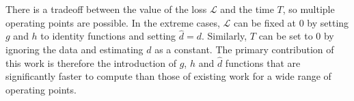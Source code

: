 

There is a tradeoff between the value of the loss $\mathcal{L}$ and the time $T$, so multiple operating points are possible. In the extreme cases, $\mathcal{L}$ can be fixed at 0 by setting $g$ and $h$ to identity functions and setting $\hat{d} = d$. Similarly, $T$ can be set to $0$ by ignoring the data and estimating $d$ as a constant. The primary contribution of this work is therefore the introduction of $g$, $h$ and $\hat{d}$ functions that are significantly faster to compute than those of existing work for a wide range of operating points.



